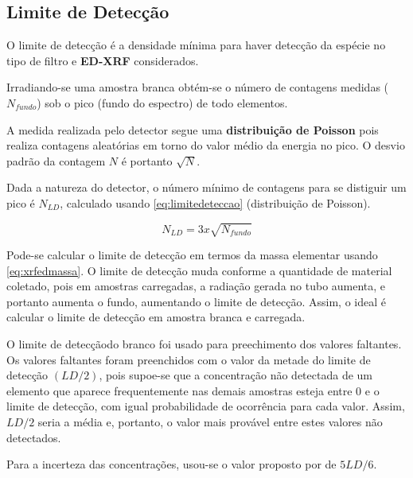 \subsection{Limite de Detecção}

O limite de detecção é a densidade mínima para haver 
detecção da espécie no tipo de filtro e \textbf{ED-XRF} considerados. 

Irradiando-se uma amostra branca obtém-se o número de contagens 
medidas ($N_{fundo}$) sob o pico (fundo do espectro) de todo elementos.

A medida realizada pelo detector segue uma \textbf{distribuição de Poisson}
pois realiza contagens aleatórias em torno do valor médio da energia 
no pico. O desvio padrão da contagem $N$ é portanto $\sqrt{N}$.

Dada a natureza do detector, o número mínimo de contagens para se 
distiguir um pico é $N_{LD}$, calculado usando \ref{eq:limitedeteccao} 
(distribuição de Poisson).

\begin{equation}
  \label{eq:limitedeteccao}
  N_{LD} = 3 x \sqrt{N_{fundo}}
\end{equation}

Pode-se calcular o limite de detecção em termos da massa 
elementar usando \ref{eq:xrfedmassa}.
O limite de detecção muda conforme a quantidade de material coletado,
pois em amostras carregadas, a radiação gerada no tubo aumenta, e 
portanto aumenta o fundo, aumentando o limite de detecção. 
Assim, o ideal é calcular o limite de detecção
em amostra branca e carregada.

O limite de detecçãodo branco foi usado para preechimento dos valores faltantes.  
Os valores faltantes foram preenchidos com o valor da metade do 
limite de detecção $(LD/2)$, pois supoe-se que a concentração não 
detectada de um elemento que aparece frequentemente nas demais amostras 
esteja entre 0 e o limite de detecção, com igual probabilidade de ocorrência 
para cada valor. Assim, $LD/2$ seria a média e, portanto, o valor mais 
provável entre estes valores não detectados. 

Para a incerteza das concentrações, usou-se o valor proposto por
\citep{polissar1998} de $5LD/6$.
